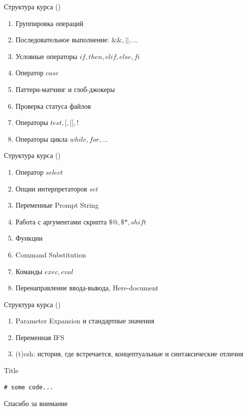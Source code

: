 \documentclass{beamer}
\begin{document}
\begin{frame}[fragile]{Структура курса ()}
\begin{enumerate} \setcounter{enumi}{\value{TocEnum}}

\item Группировка операций
\item Последовательное выполнение: $\&\&, ||, ...$
\item Условные операторы $if, then, elif, else, fi$
\item Оператор $case$
\item Паттерн-матчинг и глоб-джокеры
\item Проверка статуса файлов
\item Операторы $test, [, [[, !$
\item Операторы цикла $while, for, ...$

\setcounter{TocEnum}{\value{enumi}}
\end{enumerate}
\end{frame}

\begin{frame}[fragile]{Структура курса ()}
\begin{enumerate} \setcounter{enumi}{\value{TocEnum}}

\item Оператор $select$
\item Опции интерпретаторов $set$
\item Переменные Prompt String
\item Работа с аргументами скрипта $\$@,\$*,shift$
\item Функции
\item Command Substitution
\item Команды $exec, eval$
\item Перенаправление ввода-вывода, Here-document

\setcounter{TocEnum}{\value{enumi}}
\end{enumerate}
\end{frame}

\begin{frame}[fragile]{Структура курса ()}
\begin{enumerate} \setcounter{enumi}{\value{TocEnum}}

\item Parameter Expansion и стандартные значения
\item Переменная IFS
\item (t)csh: история, где встречается, концептуальные и синтаксические отличия

\setcounter{TocEnum}{\value{enumi}}
\end{enumerate}
\end{frame}

\begin{frame}[fragile]{Title} \begin{lstlisting}
# some code...
\end{lstlisting} 
\end{frame}

\usebackgroundtemplate{}
\begin{frame}
   \centering \LARGE Спасибо за внимание
\end{frame}
\end{document}
